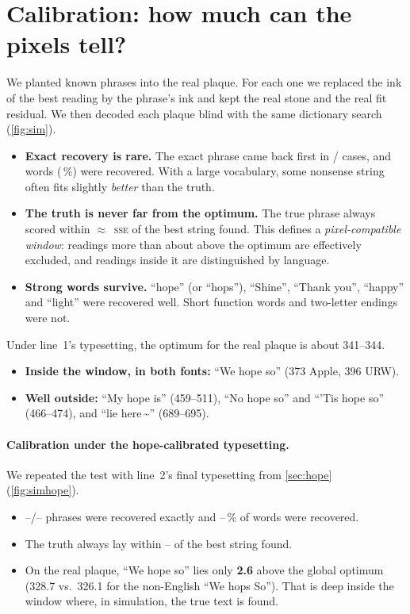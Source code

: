 \documentclass[10pt,a4paper]{article}
\providecommand{\HSimN}{--}\providecommand{\HSimExact}{--}\providecommand{\HSimMaxGap}{--}\providecommand{\HSimWordPct}{--}
\newcommand{\q}[1]{``#1''}
\newcommand{\SSE}{\textsc{sse}}
\begin{document}
\section{Calibration: how much can the pixels tell?}
\label{sec:calib}
We planted \SimN{} known phrases into the real plaque. For each one we replaced the ink of the best reading by the
phrase's ink and kept the real stone and the real fit residual. We then decoded each plaque blind with the same
dictionary search (\cref{fig:sim}).
\begin{itemize}
\item \textbf{Exact recovery is rare.} The exact phrase came back first in \SimExact/\SimN{} cases, and
\SimWords{} words (\SimWordPct\,\%) were recovered. With a large vocabulary, some nonsense string often fits slightly
\emph{better} than the truth.
\item \textbf{The truth is never far from the optimum.} The true phrase always scored within $\approx$\,\SimMaxGap{}
\SSE{} of the best string found. This defines a \emph{pixel-compatible window}: readings more than about \SimMaxGap{} above the
optimum are effectively excluded, and readings inside it are distinguished by language.
\item \textbf{Strong words survive.} \q{hope} (or \q{hops}), \q{Shine}, \q{Thank you}, \q{happy} and \q{light} were
recovered well. Short function words and two-letter endings were not.
\end{itemize}

Under line~1's typesetting, the optimum for the real plaque is about 341--344.
\begin{itemize}
\item \textbf{Inside the window, in both fonts:} \q{We hope so} (373 Apple, 396 URW).
\item \textbf{Well outside:} \q{My hope is} (459--511), \q{No hope so} and \q{'Tis hope so} (466--474), and
\q{lie here\,\textasciitilde} (689--695).
\end{itemize}

\paragraph{Calibration under the hope-calibrated typesetting.}
We repeated the test with line~2's final typesetting from \cref{sec:hope} (\cref{fig:simhope}).
\begin{itemize}
\item \HSimExact/\HSimN{} phrases were recovered exactly and \HSimWordPct\,\% of words were recovered.
\item The truth always lay within \HSimMaxGap{} of the best string found.
\item On the real plaque, \q{We hope so} lies only \textbf{2.6} above the global optimum (328.7 vs.\ 326.1 for the
non-English \q{We hops So}). That is deep inside the window where, in simulation, the true text is found.
\end{itemize}
\end{document}
